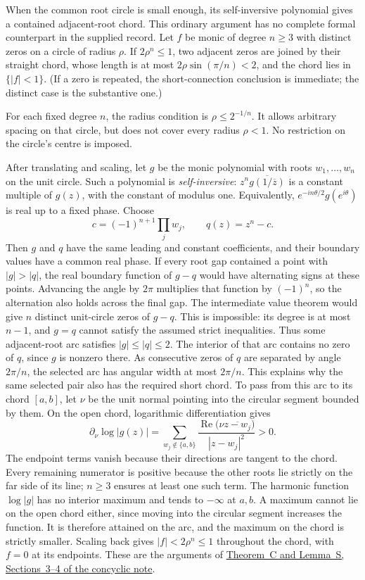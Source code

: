 \documentclass[11pt]{article}
\begin{document}
When the common root circle is small enough, its self-inversive
polynomial gives a contained adjacent-root chord. This ordinary
argument has no complete formal counterpart in the supplied record.
Let $f$ be monic of degree $n\ge3$ with distinct zeros on a circle of radius
$\rho$.  If $2\rho^n\le1$, two adjacent zeros are joined by their straight
chord, whose length is at most $2\rho\sin(\pi/n)<2$, and the chord lies in
$\{|f|<1\}$.  (If a zero is repeated, the short-connection conclusion is
immediate; the distinct case is the substantive one.)

For each fixed degree $n$, the radius condition is $\rho\le2^{-1/n}$.
It allows arbitrary spacing on that circle, but does not cover every
radius $\rho<1$. No restriction on the circle's centre is imposed.

After translating and scaling, let $g$ be the monic polynomial with
roots $w_1,\ldots,w_n$ on the unit circle. Such a polynomial is
\emph{self-inversive}: $z^n\overline{g(1/\overline z)}$
is a constant multiple of $g(z)$, with the constant of modulus one.
Equivalently, $e^{-in\theta/2}g(e^{i\theta})$ is real up to a fixed phase.
Choose
\[
 c=(-1)^{n+1}\prod_j w_j,\qquad q(z)=z^n-c.
\]
Then $g$ and $q$ have the same leading and constant coefficients, and their
boundary values have a common real phase. If every root gap contained a
point with $|g|>|q|$, the real boundary function of $g-q$ would have
alternating signs at these points. Advancing the angle by $2\pi$ multiplies
that function by $(-1)^n$, so the alternation also holds across the final
gap. The intermediate value theorem would give $n$ distinct unit-circle
zeros of $g-q$. This is impossible: its degree is at most $n-1$, and
$g=q$ cannot satisfy the assumed strict inequalities. Thus some
adjacent-root arc satisfies $|g|\le|q|\le2$. The interior of that arc contains no zero of
$q$, since $g$ is nonzero there. As consecutive zeros of $q$ are separated
by angle $2\pi/n$, the selected arc has angular width at most $2\pi/n$.
This explains why the same selected pair also has the required short chord.
To pass from this arc to its chord $[a,b]$, let $\nu$ be the unit
normal pointing into the circular segment bounded by them. On the open
chord, logarithmic differentiation gives
\[
 \partial_\nu\log|g(z)|
 =\sum_{w_j\notin\{a,b\}}
   \frac{\operatorname{Re}\bigl(\nu\overline{z-w_j}\bigr)}{|z-w_j|^2}>0.
\]
The endpoint terms vanish because their directions are tangent to the
chord. Every remaining numerator is positive because the other roots
lie strictly on the far side of its line; $n\ge3$ ensures at least one
such term. The harmonic function $\log|g|$ has no interior maximum and
tends to $-\infty$ at $a,b$. A maximum cannot lie on the open chord
either, since moving into the circular segment increases the function.
It is therefore attained on the arc, and the maximum on the chord is
strictly smaller. Scaling back gives $|f|<2\rho^n\le1$ throughout the
chord, with $f=0$ at its endpoints. These are the arguments of
\href{https://github.com/wcook04/plectis-erdos/blob/f214a6b45528dc5eefe20ffadc35f2e981627d4c/research_corpus/Erdos1041/ConcyclicAlternation.md}{Theorem~C and Lemma~S, Sections~3--4 of the concyclic note}.
\end{document}
